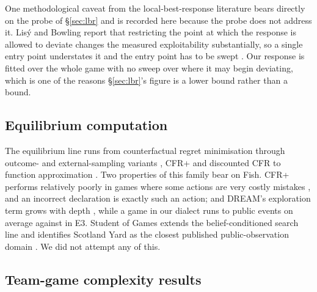 One methodological caveat from the local-best-response literature bears directly
on the probe of \S\ref{sec:lbr} and is recorded here because the probe does not
address it. Lis\'y and Bowling report that restricting the point at which the
response is allowed to deviate changes the measured exploitability substantially,
so a single entry point understates it and the entry point has to be swept
\cite{lisy-lbr}. Our response is fitted over the whole game with no sweep over
where it may begin deviating, which is one of the reasons \S\ref{sec:lbr}'s
figure is a lower bound rather than a bound.

\subsection{Equilibrium computation}

The equilibrium line runs from counterfactual regret minimisation
\cite{zinkevich-cfr} through outcome- and external-sampling variants
\cite{lanctot-mccfr}, CFR+ \cite{tammelin-cfrplus} and discounted CFR
\cite{brown-dcfr} to function approximation
\cite{brown-deepcfr,steinberger-dream}. Two properties of this family bear on
Fish. CFR+ performs relatively poorly in games where some actions are very
costly mistakes \cite{brown-dcfr}, and an incorrect declaration is exactly
such an action; and DREAM's exploration term grows with depth
\cite{steinberger-dream}, while a game in our dialect runs to
\numEventsPerGame{} public events on average against \vthree{} in E3. Student
of Games extends the belief-conditioned search line and identifies Scotland
Yard as the closest published public-observation domain \cite{schmid-sog}. We
did not attempt any of this.

\subsection{Team-game complexity results}

